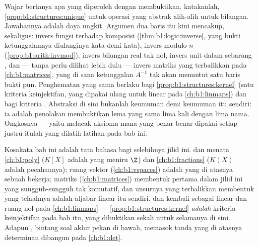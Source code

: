 \begin{remark}\label{rem:b1:structures:interlude}
Wajar bertanya apa yang diperoleh dengan membuktikan, katakanlah,
\cref{prop:b1:structures:unique} untuk operasi yang abstrak alih-alih
untuk bilangan. Jawabannya adalah daya ungkit. Argumen dua baris itu kini
mencakup, sekaligus: invers fungsi terhadap komposisi
(\cref{thm:b1:logic:inverse}, yang bukti ketunggalannya diulanginya
kata demi kata), invers modulo $n$
(\cref{prop:b1:arith:invmod}), invers bilangan real tak nol, invers
unit dalam sebarang , dan --- tanpa perlu dilihat lebih dulu --- invers
matriks yang terbalikkan pada \cref{ch:b1:matrices}, yang di sana ketunggalan $A^{-1}$
tak akan menuntut satu baris bukti pun. Penghematan yang sama berlaku bagi
\cref{prop:b1:structures:kernel} (satu kriteria keinjektifan,
yang dipakai ulang untuk  linear pada \cref{ch:b1:linmaps}) dan bagi
kriteria . Abstraksi di sini bukanlah keumuman demi keumuman
itu sendiri: ia adalah penolakan membuktikan lema yang sama lima kali
dengan lima nama. Ongkosnya --- yaitu melacak aksioma mana yang benar-benar
dipakai setiap  --- justru itulah yang dilatih latihan
pada bab ini.
\end{remark}

\begin{remark}\label{rem:b1:structures:whereused}
Kosakata bab ini adalah tata bahasa bagi selebihnya jilid
ini.  dan  menata \cref{ch:b1:poly} ($K[X]$ adalah
 yang meniru $\Z$) dan \cref{ch:b1:fractions} ($K(X)$ adalah
 pecahannya); ruang vektor (\cref{ch:b1:vspaces}) adalah
 yang di atasnya sebuah  bekerja; matriks
(\cref{ch:b1:matrices}) membentuk  pertama dalam jilid ini yang
sungguh-sungguh tak komutatif, dan unsurnya yang terbalikkan membentuk  yang
telaahnya adalah aljabar linear itu sendiri.  dan  kembali sebagai
 linear dan ruang nol pada \cref{ch:b1:linmaps} ---
\cref{prop:b1:structures:kernel} \emph{adalah} kriteria keinjektifan
pada bab itu, yang dibuktikan sekali untuk selamanya di sini. Adapun
, bintang soal akhir pekan di bawah, memasok
tanda yang di atasnya determinan dibangun pada \cref{ch:b1:det}.
\end{remark}

